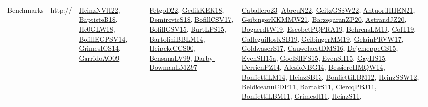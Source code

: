 {\begin{longtable}{lp{3cm}>{\raggedright}p{6cm}>{\raggedright}p{6cm}p{8cm}}
Benchmarks & http:// & \href{articles/HeinzNVH22.pdf}{HeinzNVH22}\cite{HeinzNVH22}, \href{articles/BaptisteB18.pdf}{BaptisteB18}\cite{BaptisteB18}, \href{papers/He0GLW18.pdf}{He0GLW18}\cite{He0GLW18}, \href{papers/BofillEGPSV14.pdf}{BofillEGPSV14}\cite{BofillEGPSV14}, \href{articles/GrimesIOS14.pdf}{GrimesIOS14}\cite{GrimesIOS14}, \href{articles/GarridoAO09.pdf}{GarridoAO09}\cite{GarridoAO09} & \href{articles/FetgoD22.pdf}{FetgoD22}\cite{FetgoD22}, \href{articles/GedikKEK18.pdf}{GedikKEK18}\cite{GedikKEK18}, \href{papers/DemirovicS18.pdf}{DemirovicS18}\cite{DemirovicS18}, \href{papers/BofillCSV17.pdf}{BofillCSV17}\cite{BofillCSV17}, \href{papers/BofillGSV15.pdf}{BofillGSV15}\cite{BofillGSV15}, \href{papers/BurtLPS15.pdf}{BurtLPS15}\cite{BurtLPS15}, \href{papers/BartoliniBBLM14.pdf}{BartoliniBBLM14}\cite{BartoliniBBLM14}, \href{articles/HeipckeCCS00.pdf}{HeipckeCCS00}\cite{HeipckeCCS00}, \href{articles/BensanaLV99.pdf}{BensanaLV99}\cite{BensanaLV99}, \href{articles/Darby-DowmanLMZ97.pdf}{Darby-DowmanLMZ97}\cite{Darby-DowmanLMZ97} & \href{articles/Caballero23.pdf}{Caballero23}\cite{Caballero23}, \href{articles/AbreuN22.pdf}{AbreuN22}\cite{AbreuN22}, \href{papers/GeitzGSSW22.pdf}{GeitzGSSW22}\cite{GeitzGSSW22}, \href{papers/AntuoriHHEN21.pdf}{AntuoriHHEN21}\cite{AntuoriHHEN21}, \href{papers/GeibingerKKMMW21.pdf}{GeibingerKKMMW21}\cite{GeibingerKKMMW21}, \href{papers/BarzegaranZP20.pdf}{BarzegaranZP20}\cite{BarzegaranZP20}, \href{articles/AstrandJZ20.pdf}{AstrandJZ20}\cite{AstrandJZ20}, \href{papers/BogaerdtW19.pdf}{BogaerdtW19}\cite{BogaerdtW19}, \href{articles/EscobetPQPRA19.pdf}{EscobetPQPRA19}\cite{EscobetPQPRA19}, \href{papers/BehrensLM19.pdf}{BehrensLM19}\cite{BehrensLM19}, \href{papers/ColT19.pdf}{ColT19}\cite{ColT19}, \href{papers/GalleguillosKSB19.pdf}{GalleguillosKSB19}\cite{GalleguillosKSB19}, \href{papers/GeibingerMM19.pdf}{GeibingerMM19}\cite{GeibingerMM19}, \href{papers/GelainPRVW17.pdf}{GelainPRVW17}\cite{GelainPRVW17}, \href{papers/GoldwaserS17.pdf}{GoldwaserS17}\cite{GoldwaserS17}, \href{papers/CauwelaertDMS16.pdf}{CauwelaertDMS16}\cite{CauwelaertDMS16}, \href{papers/DejemeppeCS15.pdf}{DejemeppeCS15}\cite{DejemeppeCS15}, \href{articles/EvenSH15a.pdf}{EvenSH15a}\cite{EvenSH15a}, \href{articles/GoelSHFS15.pdf}{GoelSHFS15}\cite{GoelSHFS15}, \href{papers/EvenSH15.pdf}{EvenSH15}\cite{EvenSH15}, \href{papers/GayHS15.pdf}{GayHS15}\cite{GayHS15}, \href{papers/DerrienPZ14.pdf}{DerrienPZ14}\cite{DerrienPZ14}, \href{papers/AlesioNBG14.pdf}{AlesioNBG14}\cite{AlesioNBG14}, \href{papers/BessiereHMQW14.pdf}{BessiereHMQW14}\cite{BessiereHMQW14}, \href{papers/BonfiettiLM14.pdf}{BonfiettiLM14}\cite{BonfiettiLM14}, \href{articles/HeinzSB13.pdf}{HeinzSB13}\cite{HeinzSB13}, \href{papers/BonfiettiLBM12.pdf}{BonfiettiLBM12}\cite{BonfiettiLBM12}, \href{articles/HeinzSSW12.pdf}{HeinzSSW12}\cite{HeinzSSW12}, \href{articles/BeldiceanuCDP11.pdf}{BeldiceanuCDP11}\cite{BeldiceanuCDP11}, \href{articles/BartakS11.pdf}{BartakS11}\cite{BartakS11}, \href{papers/ClercqPBJ11.pdf}{ClercqPBJ11}\cite{ClercqPBJ11}, \href{papers/BonfiettiLBM11.pdf}{BonfiettiLBM11}\cite{BonfiettiLBM11}, \href{papers/GrimesH11.pdf}{GrimesH11}\cite{GrimesH11}, \href{papers/HeinzS11.pdf}{HeinzS11}\cite{HeinzS11}, 
\end{longtable}}
